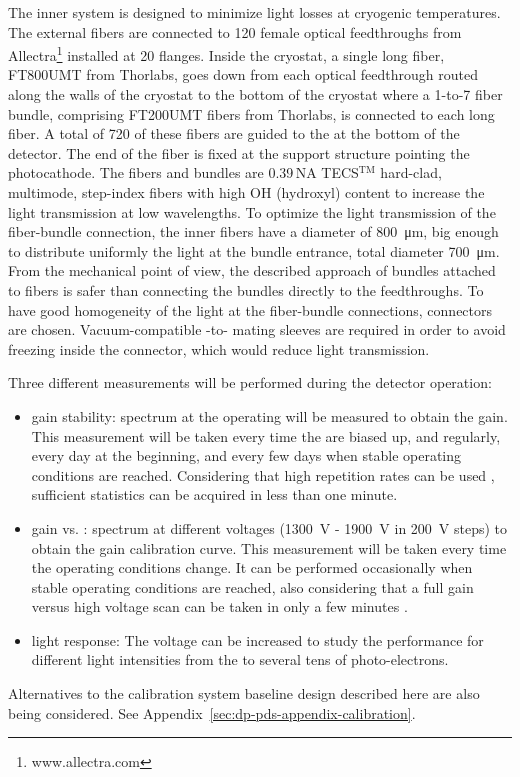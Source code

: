 The inner system is designed to minimize light losses at cryogenic temperatures. The external fibers are connected to 120 female optical feedthroughs from Allectra\footnote{www.allectra.com} installed at \num{20} flanges. Inside the cryostat, a single long fiber, FT800UMT from Thorlabs, goes down from each optical feedthrough routed along the walls of the cryostat to the bottom of the cryostat where a \num{1}-to-\num{7} fiber bundle, comprising FT200UMT fibers from Thorlabs, is connected to each long fiber. A total of \num{720} of these fibers are guided to the  at the bottom of the detector. The end of the fiber is fixed at the  support structure pointing the photocathode. The fibers and bundles are \num{0.39}\,NA TECS$^\text{TM}$ hard-clad, multimode, step-index fibers with high OH (hydroxyl) content to increase the light transmission at low wavelengths. To optimize the light transmission of the fiber-bundle connection, the inner fibers have a diameter of \SI{800}{\um}, big enough to distribute uniformly the light at the bundle entrance, total diameter \SI{700}{\um}.  From the mechanical point of view, the described approach of bundles attached to fibers is safer than connecting  the bundles directly to the feedthroughs. To have good homogeneity of the light at the fiber-bundle connections,  connectors are chosen. Vacuum-compatible -to- mating sleeves are required in order to avoid  freezing inside the connector, which would reduce light transmission.

Three different measurements will be performed during the detector operation:
\begin{itemize}
    \item gain stability:  spectrum at the  operating  will be measured to obtain the gain. This measurement will be taken every time the  are biased up, and regularly, every day at the beginning, and every few days when stable operating conditions are reached. Considering that high  repetition rates can be used \cite{Belver:2019lqm}, sufficient  statistics can be acquired in less than one minute. 
    \item gain vs. :  spectrum at different  voltages (\SI{1300}{\V} - \SI{1900}{V} in \SI{200}{V} steps) to obtain the gain calibration curve. This measurement will be taken every time the operating conditions change. It can be performed occasionally when stable operating conditions are reached, also considering that a full gain versus high voltage scan can be taken in only a few minutes .  
    \item light response: The  voltage can be increased to study the  performance for different light intensities from the  to several tens of photo-electrons.
\end{itemize}

Alternatives to the calibration system baseline design described here are also being considered. See Appendix~\ref{sec:dp-pds-appendix-calibration}. 


